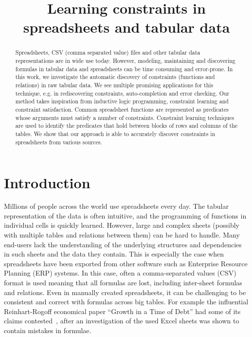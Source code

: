 \documentclass{IEEEtran}
\theoremstyle{definition}
\begin{document}
\title{Learning constraints in spreadsheets and tabular data}


\maketitle

\begin{abstract}
Spreadsheets, CSV (comma separated value) files and other tabular data representations are in wide use today.
However, modeling, maintaining and discovering formulas in tabular data and spreadsheets can be time consuming and error-prone.
In this work, we investigate the automatic discovery of constraints (functions and relations) in raw tabular data.
We see multiple promising applications for this technique, e.g. in rediscovering constraints, auto-completion and error checking.
Our method takes inspiration from inductive logic programming, constraint learning and constraint satisfaction.
Common spreadsheet functions are represented as predicates whose arguments must satisfy a number of constraints.
Constraint learning techniques are used to identify the predicates that hold between blocks of rows and columns of the tables.
We show that our approach is able to accurately discover constraints in spreadsheets from various sources.
\end{abstract}

\section{Introduction}
Millions of people across the world use spreadsheets every day.
The tabular representation of the data is often intuitive, and the programming of functions in individual cells is quickly learned.
However, large and complex sheets (possibly with multiple tables and relations between them) can be hard to handle.
Many end-users lack the understanding of the underlying structures and dependencies in such sheets and the data they contain.
This is especially the case when spreadsheets have been exported from other software such as Enterprise Resource Planning (ERP) systems.
In this case, often a comma-separated values (CSV) format is used meaning that all formulas are lost, including inter-sheet formulas and relations.
Even in manually created spreadsheets, it can be challenging to be consistent and correct with formulas across big tables.
For example the influential Reinhart-Rogoff economical paper ``Growth in a Time of Debt'' had some of its claims contested~\cite{flaw_excel}, after an investigation of the used Excel sheets was shown to contain mistakes in formulae.
\end{document}
